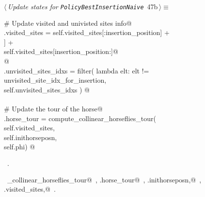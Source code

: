 \documentclass[11.5pt]{report}
\begin{document}
\vspace{-0.8cm}\newchunk 

\begin{flushleft} \small\label{scrap73}\raggedright\small
{} $\langle\,${\itshape Update states for \texttt{PolicyBestInsertionNaive}}\nobreak\ {\footnotesize {47b}}$\,\rangle\equiv$
\vspace{-1ex}
\begin{list}{}{} \item
\mbox{}\verb@# Update visited and univisted sites info@\\
\mbox{}\verb@self.visited_sites = self.visited_sites[:insertion_position]      +\@\\
\mbox{}\verb@                     [self.sites[unvisited_site_idx_for_insertion]] +\@\\
\mbox{}\verb@                     self.visited_sites[insertion_position:]@\\
\mbox{}\verb@  @\\
\mbox{}\verb@self.unvisited_sites_idxs = filter( lambda elt: elt != unvisited_site_idx_for_insertion, \@\\
\mbox{}\verb@                                    self.unvisited_sites_idxs ) @\\
\mbox{}\verb@@\\
\mbox{}\verb@# Update the tour of the horse@\\
\mbox{}\verb@self.horse_tour = compute_collinear_horseflies_tour(\@\\
\mbox{}\verb@                           self.visited_sites,         \@\\
\mbox{}\verb@                           self.inithorseposn, \@\\
\mbox{}\verb@                           self.phi) @\\
\mbox{}\verb@@{\NWsep}
\end{list}
\vspace{-1.5ex}
\footnotesize
\begin{list}{}{\setlength{\itemsep}{-\parsep}\setlength{\itemindent}{-\leftmargin}}
\item \NWtxtMacroRefIn\ .
\item \NWtxtIdentsUsed\nobreak\  \verb@compute_collinear_horseflies_tour@\nobreak\ , \verb@self.horse_tour@\nobreak\ , \verb@self.inithorseposn,@\nobreak\ , \verb@self.visited_sites,@\nobreak\ .
\item{}
\end{list}
\vspace{4ex}
\end{flushleft}
\newpage
\end{document}
